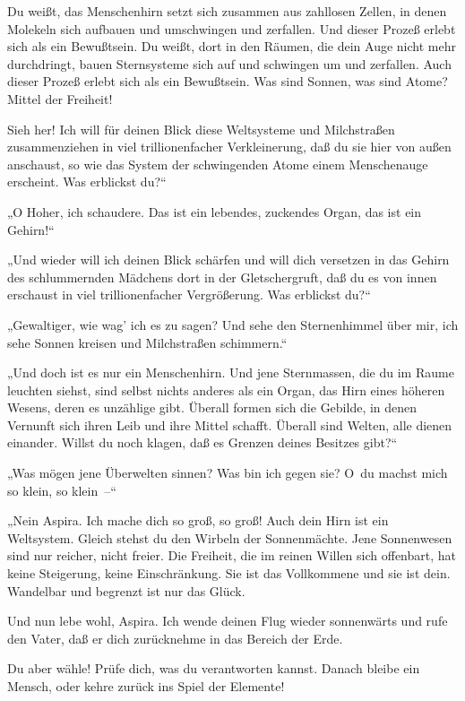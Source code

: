 Du weißt, das Menschenhirn setzt sich zusammen aus zahllosen
Zellen, in denen Molekeln sich aufbauen und umschwingen und
zerfallen. Und dieser Prozeß erlebt sich als ein Bewußtsein. Du
weißt, dort in den Räumen, die dein Auge nicht mehr durchdringt,
bauen Sternsysteme sich auf und schwingen um und zerfallen. Auch
dieser Prozeß erlebt sich als ein Bewußtsein. Was sind Sonnen, was
sind Atome? Mittel der Freiheit!

Sieh her! Ich will für deinen Blick diese Weltsysteme und
Milchstraßen zusammenziehen in viel trillionenfacher Verkleinerung,
daß du sie hier von außen anschaust, so wie das System der
schwingenden Atome einem Menschenauge erscheint. Was erblickst
du?“

„O Hoher, ich schaudere. Das ist ein lebendes, zuckendes Organ, das
ist ein Gehirn!“

„Und wieder will ich deinen Blick schärfen und will dich versetzen
in das Gehirn des schlummernden Mädchens dort in der
Gletschergruft, daß du es von innen erschaust in viel
trillionenfacher Vergrößerung. Was erblickst du?“

„Gewaltiger, wie wag' ich es zu sagen? Und sehe den Sternenhimmel
über mir, ich sehe Sonnen kreisen und Milchstraßen schimmern.“

„Und doch ist es nur ein Menschenhirn. Und jene Sternmassen, die du
im Raume leuchten siehst, sind selbst nichts anderes als ein Organ,
das Hirn eines höheren Wesens, deren es unzählige gibt. Überall
formen sich die Gebilde, in denen Vernunft sich ihren Leib und ihre
Mittel schafft. Überall sind Welten, alle dienen einander. Willst
du noch klagen, daß es Grenzen deines Besitzes gibt?“

„Was mögen jene Überwelten sinnen? Was bin ich gegen sie? O~du
machst mich so klein, so klein~–“

„Nein Aspira. Ich mache dich so groß, so groß! Auch dein Hirn ist
ein Weltsystem. Gleich stehst du den Wirbeln der Sonnenmächte. Jene
Sonnenwesen sind nur reicher, nicht freier. Die Freiheit, die im
reinen Willen sich offenbart, hat keine Steigerung, keine
Einschränkung. Sie ist das Vollkommene und sie ist dein. Wandelbar
und begrenzt ist nur das Glück.

Und nun lebe wohl, Aspira. Ich wende deinen Flug wieder sonnenwärts
und rufe den Vater, daß er dich zurücknehme in das Bereich der
Erde.

Du aber wähle! Prüfe dich, was du verantworten kannst. Danach
bleibe ein Mensch, oder kehre zurück ins Spiel der Elemente!


